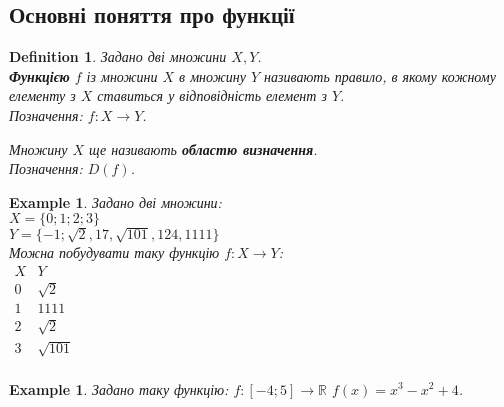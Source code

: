 \documentclass[a4paper, 14pt]{article}
\theoremstyle{theoremdd}
\theoremstyle{theoremdd}
\newtheorem{definition}[theorem]{Definition}
\theoremstyle{theoremdd}
\theoremstyle{theoremdd}
\newtheorem{example}[theorem]{Example}
\theoremstyle{theoremdd}
\theoremstyle{theoremdd}
\theoremstyle{theoremdd}
\theoremstyle{theoremdd}
\begin{document}
	\subsection{Основні поняття про функції}
	\begin{definition}
	Задано дві множини $X,Y$.\\
	\textbf{Функцією} $f$ із множини $X$ в множину $Y$ називають правило, в якому кожному елементу з $X$ ставиться у відповідність елемент з $Y$.\\
	Позначення: $f: X \to Y$.
	\begin{figure}[H]
\end{figure}
	Множину $X$ ще називають \textbf{областю визначення}.\\
	Позначення: $D(f)$.
	\end{definition}
	
	\begin{example}
	Задано дві множини:\\
	$X = \{0; 1; 2; 3 \}$ \\ $Y = \{-1; \sqrt{2}, 17, \sqrt{101}, 124, 1111\}$\\ 
	Можна побудувати таку функцію $f: X \to Y$:\\
	$\begin{matrix}
	X & Y \\
	0 & \sqrt{2} \\
	1 & 1111 \\
	2 & \sqrt{2} \\
	3 & \sqrt{101} \\
	\end{matrix}$
	\end{example}
	
	\begin{example}
	Задано таку функцію: $f: [-4; 5] \to \mathbb{R}$ \hspace{1cm} $f(x) = x^3-x^2+4$.
	\end{example}
	
\end{document}
